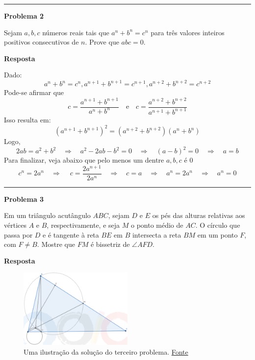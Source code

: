 \documentclass{article}
\begin{document}
  \noindent\rule{\linewidth}{0.4pt}

  {\centering \textbf{Problema 2} \par}
  Sejam \( a, b, c \) números reais tais que \( a^n + b^n = c^n \) para três valores inteiros positivos consecutivos de \( n \). Prove que \( abc = 0 \).

  \medskip

  {\centering \textbf{Resposta} \par}

  Dado:
  \[
    a^n + b^n = c^n, a^{n+1} + b^{n+1} = c^{n+1}, a^{n+2} + b^{n+2} = c^{n+2}
  \]
  Pode-se afirmar que
  \[
    c = \frac{a^{n+1} + b^{n+1}}{a^n + b^n} \quad \text{e} \quad c = \frac{a^{n+2} + b^{n+2}}{a^{n+1} + b^{n+1}}
  \]
  Isso resulta em:
  \[
    (a^{n+1} + b^{n+1})^2 = (a^{n+2} + b^{n+2})(a^n + b^n)
  \]
  Logo,
  \[
    2ab = a^2 + b^2 \quad \Rightarrow \quad a^2 - 2ab -b^2 = 0 \quad \Rightarrow \quad (a-b)^2 = 0 \quad \Rightarrow \quad a = b
  \]
  Para finalizar, veja abaixo que  pelo menos um dentre $a,b,c$ é 0
  \[
    c^n = 2a^n \quad \Rightarrow \ \quad c = \frac{2a^{n+1}}{2a^n} \quad \Rightarrow \quad c = a \quad \Rightarrow \quad a^n = 2a^n \quad \Rightarrow \quad a^n = 0
  \]

  \noindent\rule{\linewidth}{0.4pt}

  {\centering \textbf{Problema 3} \par}
  Em um triângulo acutângulo \( ABC \), sejam \( D \) e \( E \) os pés das alturas relativas aos vértices \( A \) e \( B \), respectivamente, e seja \( M \) o
  ponto médio de \( AC \). O círculo que passa por \( D \) e é tangente à reta \( BE \) em \( B \) intersecta a reta \( BM \) em um ponto \( F \), com \( F \ne B \). Mostre que
  \( FM \) é bissetriz de \( \angle AFD \).

  \medskip

  {\centering \textbf{Resposta} \par}

  \begin{figure}[h]
    \centering
    \includegraphics[width=0.5\textwidth]{first.png}
    \caption{Uma ilustração da solução do terceiro problema. \href{https://noic.com.br/wp-content/uploads/2023/11/Solucoes_da_TM2_Nivel_A.pdf}{Fonte}}
  \end{figure}
\end{document}
